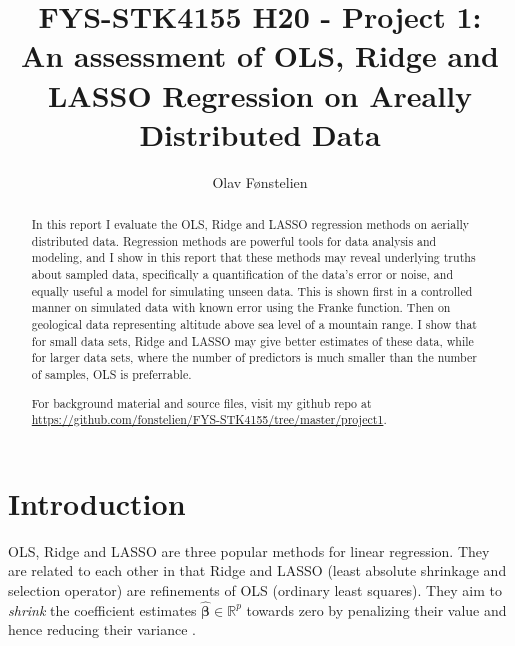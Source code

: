 \documentclass[]{article}
\title{FYS-STK4155 H20 - Project 1:\\An assessment of OLS, Ridge and LASSO Regression on Areally Distributed Data}
\author{Olav Fønstelien}
\begin{document}
\maketitle

\begin{abstract}
In this report I evaluate the OLS, Ridge and LASSO regression methods on aerially distributed data. Regression methods are powerful tools for data analysis and modeling, and I show in this report that these methods may reveal underlying truths about sampled data, specifically a quantification of the data's error or noise, and equally useful a model for simulating unseen data. This is shown first in a controlled manner on simulated data with known error using the Franke function. Then on geological data representing altitude above sea level of a mountain range. I show that for small data sets, Ridge and LASSO may give better estimates of these data, while for larger data sets, where the number of predictors is much smaller than the number of samples, OLS is preferrable.

For background material and source files, visit my github repo at \url{https://github.com/fonstelien/FYS-STK4155/tree/master/project1}.

\end{abstract}

\section{Introduction} \label{intro}
OLS, Ridge and LASSO are three popular methods for linear regression. They are related to each other in that Ridge and LASSO (least absolute shrinkage and selection operator) are refinements of OLS (ordinary least squares). They aim to \textit{shrink} the coefficient estimates $\mathbf{\hat{\beta}} \in \mathbb{R}^p$ towards zero by penalizing their value and hence reducing their variance \cite{james2013introduction}.
\end{document}

